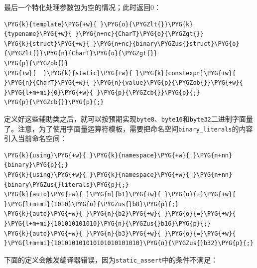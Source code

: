 
最后一个特化处理参数包为空的情况；此时返回0：



\begin{codeblockbg}
\begin{Verbatim}[commandchars=\\\{\},breaklines=true,breakanywhere=true,fontsize=\codefont,xleftmargin=17bp]
\PYG{k}{template}\PYG{+w}{ }\PYG{o}{\PYGZlt{}}\PYG{k}{typename}\PYG{+w}{ }\PYG{n+nc}{CharT}\PYG{o}{\PYGZgt{}}
\PYG{k}{struct}\PYG{+w}{ }\PYG{n+nc}{binary\PYGZus{}struct}\PYG{o}{\PYGZlt{}}\PYG{n}{CharT}\PYG{o}{\PYGZgt{}}
\PYG{p}{\PYGZob{}}
\PYG{+w}{  }\PYG{k}{static}\PYG{+w}{ }\PYG{k}{constexpr}\PYG{+w}{ }\PYG{n}{CharT}\PYG{+w}{ }\PYG{n}{value}\PYG{p}{\PYGZob{}}\PYG{+w}{ }\PYG{l+m+mi}{0}\PYG{+w}{ }\PYG{p}{\PYGZcb{}}\PYG{p}{;}
\PYG{p}{\PYGZcb{}}\PYG{p}{;}
\end{Verbatim}
\end{codeblockbg}



定义好这些辅助类之后，就可以按预期实现\texttt{byte8}、\texttt{byte16}和\texttt{byte32}二进制字面量了。注意，为了使用字面量运算符模板，需要把命名空间\texttt{binary\_\allowbreak{}literals}的内容引入当前命名空间：



\begin{codeblockbg}
\begin{Verbatim}[commandchars=\\\{\},breaklines=true,breakanywhere=true,fontsize=\codefont,xleftmargin=17bp]
\PYG{k}{using}\PYG{+w}{ }\PYG{k}{namespace}\PYG{+w}{ }\PYG{n+nn}{binary}\PYG{p}{;}
\PYG{k}{using}\PYG{+w}{ }\PYG{k}{namespace}\PYG{+w}{ }\PYG{n+nn}{binary\PYGZus{}literals}\PYG{p}{;}
\PYG{k}{auto}\PYG{+w}{ }\PYG{n}{b1}\PYG{+w}{ }\PYG{o}{=}\PYG{+w}{ }\PYG{l+m+mi}{1010}\PYG{n}{\PYGZus{}b8}\PYG{p}{;}
\PYG{k}{auto}\PYG{+w}{ }\PYG{n}{b2}\PYG{+w}{ }\PYG{o}{=}\PYG{+w}{ }\PYG{l+m+mi}{101010101010}\PYG{n}{\PYGZus{}b16}\PYG{p}{;}
\PYG{k}{auto}\PYG{+w}{ }\PYG{n}{b3}\PYG{+w}{ }\PYG{o}{=}\PYG{+w}{ }\PYG{l+m+mi}{101010101010101010101010}\PYG{n}{\PYGZus{}b32}\PYG{p}{;}
\end{Verbatim}
\end{codeblockbg}



下面的定义会触发编译器错误，因为\texttt{static\_\allowbreak{}assert}中的条件不满足：



